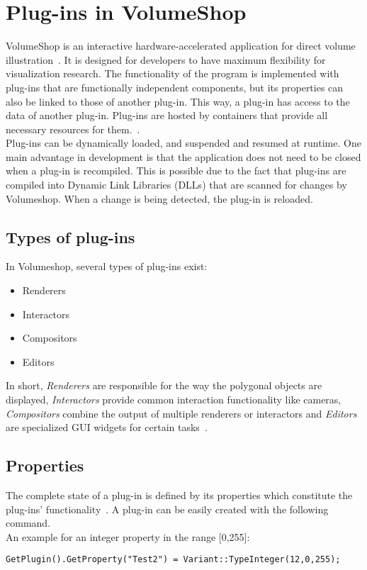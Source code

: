 
\section{Plug-ins in VolumeShop}
VolumeShop is an interactive hardware-accelerated application for direct volume illustration~\cite{proc:volumeshop}. It is designed for developers to have maximum flexibility for visualization research. The functionality of the program is implemented with plug-ins that are functionally independent components, but its properties can also be linked to those of another plug-in. This way, a plug-in has access to the data of another plug-in. Plug-ins are hosted by containers that provide all necessary resources for them.~\cite{misc:volumeshop101}.\\
\newline
Plug-ins can be dynamically loaded, and suspended and resumed at runtime. One main advantage in development is that the application does not need to be closed when a plug-in is recompiled. This is possible due to the fact that plug-ins are compiled into Dynamic Link Libraries (DLLs) that are scanned for changes by Volumeshop. When a change is being detected, the plug-in is reloaded.

\subsection{Types of plug-ins}
In Volumeshop, several types of plug-ins exist:
\begin{itemize}
	\item Renderers
	\item Interactors
	\item Compositors
	\item Editors
\end{itemize}

In short, \emph{Renderers} are responsible for the way the polygonal objects are displayed, \emph{Interactors} provide common interaction functionality like cameras, \emph{Compositors} combine the output of multiple renderers or interactors and \emph{Editors} are specialized GUI widgets for certain tasks~\cite{misc:volumeshop101}.

\subsection{Properties}
The complete state of a plug-in is defined by its properties which constitute the plug-ins' functionality~\cite{misc:volumeshop101}. A plug-in can be easily created with the following command. \\
An example for an integer property in the range [0,255]:
\begin{lstlisting}
GetPlugin().GetProperty("Test2") = Variant::TypeInteger(12,0,255);
\end{lstlisting}

